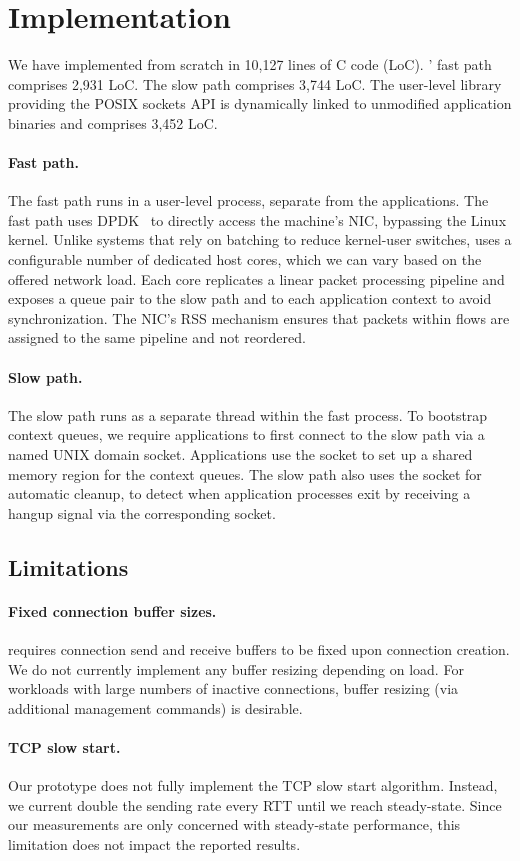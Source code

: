 \section{Implementation}\label{sec:impl}

We have implemented \taas from scratch in 10,127 lines of C code
(LoC). \taas' fast path comprises 2,931 LoC. The slow path comprises
3,744 LoC. The user-level library providing the POSIX sockets API is
dynamically linked to unmodified application binaries and comprises
3,452 LoC.

\paragraph{Fast path.}
The fast path runs in a user-level process, separate from the
applications. The fast path uses DPDK~\cite{dpdk} to directly access
the machine's NIC, bypassing the Linux kernel. Unlike systems that
rely on batching to reduce kernel-user switches, \taas uses a
configurable number of dedicated host cores, which we can vary based
on the offered network load. Each core replicates a linear packet
processing pipeline and exposes a queue pair to the slow path and to
each application context to avoid synchronization. The NIC's RSS
mechanism ensures that packets within flows are assigned to the same
pipeline and not reordered.

\paragraph{Slow path.} The slow path runs as a separate thread within
the fast process. To bootstrap context queues, we require applications
to first connect to the slow path via a named UNIX domain
socket. Applications use the socket to set up a shared memory region
for the context queues. The slow path also uses the socket for
automatic cleanup, to detect when application processes exit by
receiving a hangup signal via the corresponding socket.

\subsection{Limitations}

\paragraph{Fixed connection buffer sizes.}
\softtcp requires connection send and receive buffers to be fixed upon
connection creation. We do not currently implement any buffer resizing
depending on load.  For workloads with large numbers of inactive
connections, buffer resizing (via additional management commands) is
desirable.

\paragraph{TCP slow start.} Our prototype does not fully implement the
TCP slow start algorithm. Instead, we current double the sending rate
every RTT until we reach steady-state. Since our measurements are only
concerned with steady-state performance, this limitation does not
impact the reported results.
